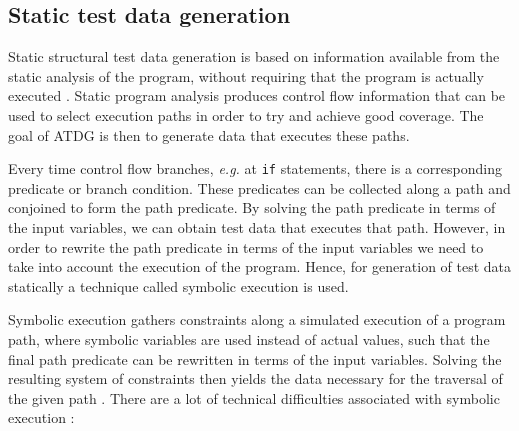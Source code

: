 \documentclass[a4paper,11pt,titlepage]{report}
\begin{document}

\subsection{Static test data generation}
Static structural test data generation is based on information available from the static analysis of the program, without requiring that the program is actually executed \cite{mcminn2004search}. Static program analysis produces control flow information that can be used to select execution paths in order to try and achieve good coverage. The goal of ATDG is then to generate data that executes these paths.

Every time control flow branches, \emph{e.g.} at \texttt{if} statements, there is a corresponding predicate or branch condition. These predicates can be collected along a path and conjoined to form the path predicate. By solving the path predicate in terms of the input variables, we can obtain test data that executes that path. However, in order to rewrite the path predicate in terms of the input variables we need to take into account the execution of the program. Hence, for generation of test data statically a technique called symbolic execution \cite{king1976symbolic} is used.

Symbolic execution gathers constraints along a simulated execution of a program path, where symbolic variables are used instead of actual values, such that the final path predicate can be rewritten in terms of the input variables. Solving the resulting system of constraints then yields the data necessary for the traversal of the given path \cite{king1975new, king1976symbolic}. There are a lot of technical difficulties associated with symbolic execution \cite{edvardsson1999survey,meudec2001atgen,mcminn2004search}:

\renewcommand{\labelitemi}{\tiny$\blacksquare$}
\end{document}
